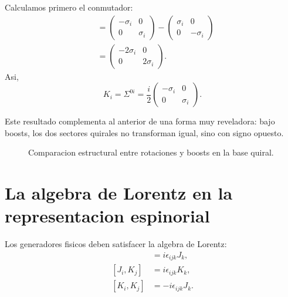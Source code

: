 Calculamos primero el conmutador:
\begin{align}
[\gamma^0,\gamma^i]
&=
\begin{pmatrix}
-\sigma_i & 0\\
0 & \sigma_i
\end{pmatrix}
-
\begin{pmatrix}
\sigma_i & 0\\
0 & -\sigma_i
\end{pmatrix}
\\
&=
\begin{pmatrix}
-2\sigma_i & 0\\
0 & 2\sigma_i
\end{pmatrix}.
\end{align}
Asi,
\begin{equation}
\boxed{
K_i=\Sigma^{0i}
=
\frac{i}{2}
\begin{pmatrix}
-\sigma_i & 0\\
0 & \sigma_i
\end{pmatrix}.
}
\label{c16:eq:Kmatrix}
\end{equation}

Este resultado complementa al anterior de una forma muy reveladora: bajo boosts, los dos sectores quirales no transforman igual, sino con signo opuesto.

\begin{figure}[h!]
\centering
{}
\caption{Comparacion estructural entre rotaciones y boosts en la base quiral.}
\end{figure}

\section{La algebra de Lorentz en la representacion espinorial}
Los generadores fisicos deben satisfacer la algebra de Lorentz:
\begin{align}
[J_i,J_j] &= i\epsilon_{ijk}J_k,\\
[J_i,K_j] &= i\epsilon_{ijk}K_k,\\
[K_i,K_j] &= -i\epsilon_{ijk}J_k.
\label{c16:eq:loralg}
\end{align}

